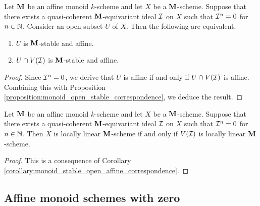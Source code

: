 \begin{corollary}\label{corollary:monoid_stable_open_affine_correspondence}
Let $\mathbf{M}$ be an affine monoid $k$-scheme and let $X$ be a $\mathbf{M}$-scheme. Suppose that there exists a quasi-coherent $\mathbf{M}$-equivariant ideal ${\mathcal I}$ on $X$ such that ${\mathcal I}^n = 0$ for $n\in {\mathbb N}$. Consider an open subset $U$ of $X$. Then the following are equivalent.
\begin{enumerate}[label=\emph{\textbf{(\arabic*)}}, leftmargin=1.5em]
\item $U$ is $\mathbf{M}$-stable and affine.
\item $U\cap V({\mathcal I})$ is $\mathbf{M}$-stable and affine.
\end{enumerate}
\end{corollary}
\begin{proof}
Since ${\mathcal I}^n = 0$, we derive that $U$ is affine if and only if $U\cap V({\mathcal I})$ is affine. Combining this with Proposition \ref{proposition:monoid_open_stable_correspondence}, we deduce the result.
\end{proof}

\begin{corollary}\label{corollary:locally_linear_are_stable_under_thickenings}
Let $\mathbf{M}$ be an affine monoid $k$-scheme and let $X$ be a $\mathbf{M}$-scheme. Suppose that there exists a quasi-coherent $\mathbf{M}$-equivariant ideal ${\mathcal I}$ on $X$ such that ${\mathcal I}^n = 0$ for $n\in {\mathbb N}$. Then $X$ is locally linear $\mathbf{M}$-scheme if and only if $V({\mathcal I})$ is locally linear $\mathbf{M}$-scheme.
\end{corollary}
\begin{proof}
This is a consequence of Corollary \ref{corollary:monoid_stable_open_affine_correspondence}.
\end{proof}

\subsection{Affine monoid schemes with zero}

